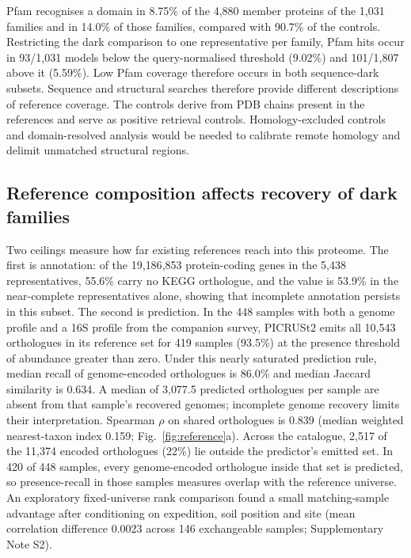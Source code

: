 \documentclass[11pt]{article}
\begin{document}
Pfam recognises a domain in 8.75\% of the 4{,}880 member proteins of the 1{,}031 families and
in 14.0\% of those families, compared with 90.7\% of the controls. Restricting the dark comparison to one representative per family, Pfam hits occur in 93/1{,}031 models below the query-normalised threshold (9.02\%) and 101/1{,}807 above it (5.59\%). Low Pfam coverage therefore occurs in both sequence-dark subsets. Sequence and structural
searches therefore provide different descriptions of reference coverage. The controls derive
from PDB chains present in the references and serve as positive retrieval controls. Homology-excluded
controls and domain-resolved analysis would be needed to calibrate remote homology and delimit
unmatched structural regions.

\subsection*{Reference composition affects recovery of dark families}

Two ceilings measure how far existing references reach into this proteome. The first is
annotation: of the 19{,}186{,}853 protein-coding genes in the 5{,}438 representatives, 55.6\% carry
no KEGG orthologue, and the value is 53.9\% in the near-complete representatives alone, showing that incomplete annotation persists in this subset. The second is prediction. In the 448
samples with both a genome profile and a 16S profile from the companion survey, PICRUSt2
emits all 10{,}543 orthologues in its reference set for 419 samples (93.5\%) at the presence
threshold of abundance greater than zero. Under this nearly saturated prediction rule,
median recall of genome-encoded orthologues is 86.0\% and median Jaccard similarity is 0.634.
A median of 3{,}077.5 predicted orthologues per sample are absent from that sample's recovered
genomes; incomplete genome recovery limits their interpretation. Spearman $\rho$ on shared
orthologues is 0.839 (median weighted nearest-taxon index 0.159; Fig.~\ref{fig:reference}a).
Across the catalogue, 2{,}517 of the 11{,}374 encoded orthologues (22\%) lie outside the predictor's
emitted set. In 420 of 448 samples, every genome-encoded orthologue inside that set is predicted,
so presence-recall in those samples measures overlap with the reference universe.
An exploratory fixed-universe rank comparison found a small matching-sample advantage after conditioning on expedition, soil position and site (mean correlation difference 0.0023 across 146 exchangeable samples; Supplementary Note S2).
\end{document}

